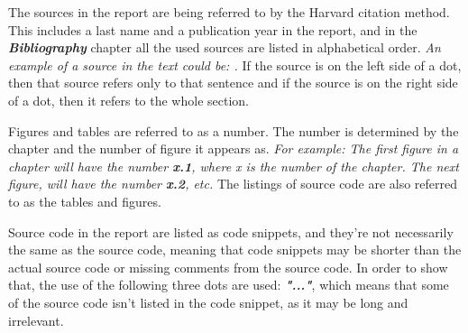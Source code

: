 The sources in the report are being referred to by the Harvard citation method. This includes a last name and a publication year in the report, and in the \textit{\textbf{Bibliography}} chapter all the used sources are listed in alphabetical order. \newline
\textit{An example of a source in the text could be: \textbf{\citep{Sebesta}}.}
\newline
If the source is on the left side of a dot, then that source refers only to that sentence and if the source is on the right side of a dot, then it refers to the whole section. 

Figures and tables are referred to as a number. The number is determined by the chapter and the number of figure it appears as. \newline
\textit{For example: The first figure in a chapter will have the number \textbf{x.1}, where x is the number of the chapter. The next figure, will have the number \textbf{x.2}, etc.}
\newline
The listings of source code are also referred to as the tables and figures. 

Source code in the report are listed as code snippets, and they're not necessarily the same as the source code, meaning that code snippets may be shorter than the actual source code or missing comments from the source code. In order to show that, the use of the following three dots are used: \textit\textbf{{"..."}}, which means that some of the source code isn't listed in the code snippet, as it may be long and irrelevant. 

